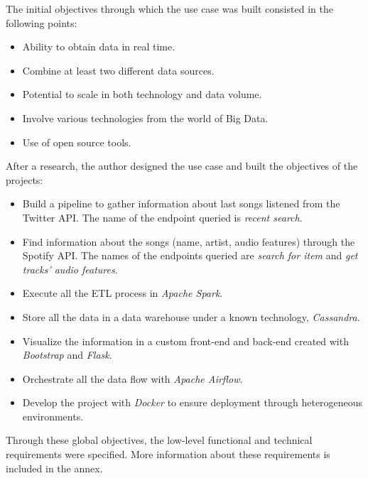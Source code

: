

\nonzeroparskip The initial objectives through which the use case was built consisted in the following points:
\begin{itemize}
	\item Ability to obtain data in real time.
	\item Combine at least two different data sources.
	\item Potential to scale in both technology and data volume.
	\item Involve various technologies from the world of Big Data.
	\item Use of open source tools.
\end{itemize}

\nonzeroparskip After a research, the author designed the use case and built the objectives of the projects:
\begin{itemize}
	\item Build a pipeline to gather information about last songs listened from the Twitter API. The name of the endpoint queried is \textit{recent search}.
	\item Find information about the songs (name, artist, audio features) through the Spotify API. The names of the endpoints queried are \textit{search for item} and \textit{get tracks' audio features}.
	\item Execute all the ETL process in \textit{Apache Spark}.
	\item Store all the data in a data warehouse under a known technology, \textit{Cassandra}.
	\item Visualize the information in a custom front-end and back-end created with \textit{Bootstrap} and \textit{Flask}.
	\item Orchestrate all the data flow with \textit{Apache Airflow}.
	\item Develop the project with \textit{Docker} to ensure deployment through heterogeneous environments.
\end{itemize}

\nonzeroparskip Through these global objectives, the low-level functional and technical requirements were specified. More information about these requirements is included in the annex.